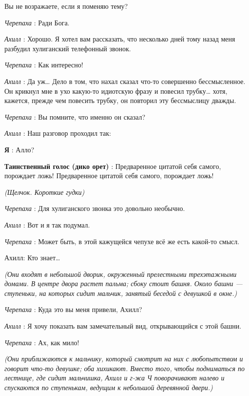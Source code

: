 \documentclass[../main.tex]{subfiles}
\begin{document}


\begin{dialogue}

 Вы не возражаете, если я поменяю тему?

\emph{Черепаха} : Ради Бога.

\emph{Ахилл} : Хорошо. Я хотел вам рассказать, что несколько дней тому назад меня разбудил хулиганский телефонный звонок.

\emph{Черепаха} : Как интересно!

\emph{Ахилл} : Да уж\ldots{} Дело в том, что нахал сказал что-то совершенно бессмысленное. Он крикнул мне в ухо какую-то идиотскую фразу и повесил трубку\ldots{} хотя, кажется, прежде чем повесить трубку, он повторил эту бессмыслицу дважды.

\emph{Черепаха} : Вы помните, что именно он сказал?

\emph{Ахилл} : Наш разговор проходил так:

\textbf{Я} : Алло?

\textbf{Таинственный голос (дико орет)} : Предваренное цитатой себя самого, порождает ложь! Предваренное цитатой себя самого, порождает ложь!

\emph{(Щелчок. Короткие гудки)}

\emph{Черепаха} : Для хулиганского звонка это довольно необычно.

\emph{Ахилл} : Вот и я так подумал.

\emph{Черепаха} : Может быть, в этой кажущейся чепухе всё же есть какой-то смысл.

Ахилл: Кто знает\ldots{}

\emph{(Они входят в небольшой дворик, окруженный прелестными трехэтажными домами. В центре двора растет пальма; сбоку стоит башня. Около башни --- ступеньки, на которых сидит мальчик, занятый беседой с девушкой в окне.)}

\emph{Черепаха} : Куда это вы меня привели, Ахилл?

\emph{Ахилл} : Я хочу показать вам замечательный вид, открывающийся с этой башни.

\emph{Черепаха} : Ах, как мило!

\emph{(Они приближаются к мальчику, который смотрит на них с любопытством и говорит что-то девушке; оба хихикают. Вместо того, чтобы подниматься по лестнице, где сидит мальчишка, Ахилл и г-жа Ч поворачивают налево и спускаются по ступенькам, ведущим к небольшой деревянной двери.)}


\end{dialogue}
\end{document}
